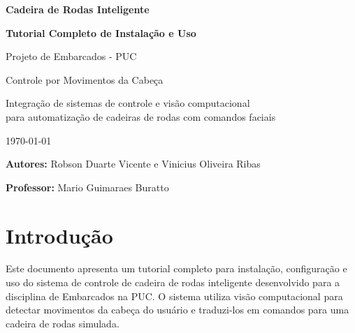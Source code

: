 \documentclass[12pt,a4paper]{article}
\begin{document}
\begin{titlepage}
    \centering
    \vspace*{2cm}
    
    {\Huge\bfseries Cadeira de Rodas Inteligente\par}
    \vspace{0.5cm}
    
    {\Large\bfseries Tutorial Completo de Instalação e Uso\par}
    \vspace{1cm}
    
    {\large Projeto de Embarcados - PUC\par}
    \vspace{0.5cm}
    
    {\large Controle por Movimentos da Cabeça\par}
    \vspace{1cm}
    
    {\large Integração de sistemas de controle e visão computacional\\para automatização de cadeiras de rodas com comandos faciais\par}
    \vspace{1cm}

    
    \vfill
    
    {\large \today\par}
    
    \vspace{1cm}
    
    {\large \textbf{Autores:} Robson Duarte Vicente e Vinicius Oliveira Ribas\par}
    \vspace{0.5cm}
    
    {\large \textbf{Professor:} Mario Guimaraes Buratto\par}
    
\end{titlepage}

\tableofcontents
\newpage

\section{Introdução}

Este documento apresenta um tutorial completo para instalação, configuração e uso do sistema de controle de cadeira de rodas inteligente desenvolvido para a disciplina de Embarcados na PUC. O sistema utiliza visão computacional para detectar movimentos da cabeça do usuário e traduzi-los em comandos para uma cadeira de rodas simulada.
\end{document}
